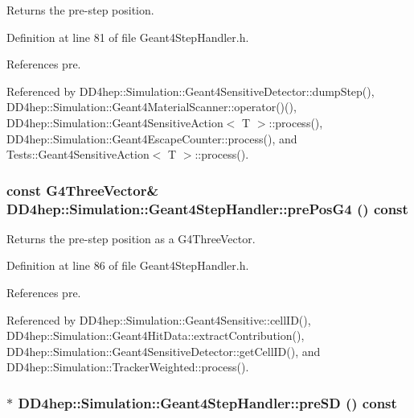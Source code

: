 Returns the pre-\/step position. 

Definition at line 81 of file Geant4StepHandler.h.

References pre.

Referenced by DD4hep::Simulation::Geant4SensitiveDetector::dumpStep(), DD4hep::Simulation::Geant4MaterialScanner::operator()(), DD4hep::Simulation::Geant4SensitiveAction$<$ T $>$::process(), DD4hep::Simulation::Geant4EscapeCounter::process(), and Tests::Geant4SensitiveAction$<$ T $>$::process().\hypertarget{class_d_d4hep_1_1_simulation_1_1_geant4_step_handler_a1cecfe16026e80f0b803b3d113b8e535}{
\subsubsection[{prePosG4}]{\setlength{\rightskip}{0pt plus 5cm}const G4ThreeVector\& DD4hep::Simulation::Geant4StepHandler::prePosG4 () const}}
\label{class_d_d4hep_1_1_simulation_1_1_geant4_step_handler_a1cecfe16026e80f0b803b3d113b8e535}


Returns the pre-\/step position as a G4ThreeVector. 

Definition at line 86 of file Geant4StepHandler.h.

References pre.

Referenced by DD4hep::Simulation::Geant4Sensitive::cellID(), DD4hep::Simulation::Geant4HitData::extractContribution(), DD4hep::Simulation::Geant4SensitiveDetector::getCellID(), and DD4hep::Simulation::TrackerWeighted::process().\hypertarget{class_d_d4hep_1_1_simulation_1_1_geant4_step_handler_afa4f53d4d2e41898f948baf79fabd29b}{
\subsubsection[{preSD}]{$\ast$ DD4hep::Simulation::Geant4StepHandler::preSD () const}}
\label{class_d_d4hep_1_1_simulation_1_1_geant4_step_handler_afa4f53d4d2e41898f948baf79fabd29b}


